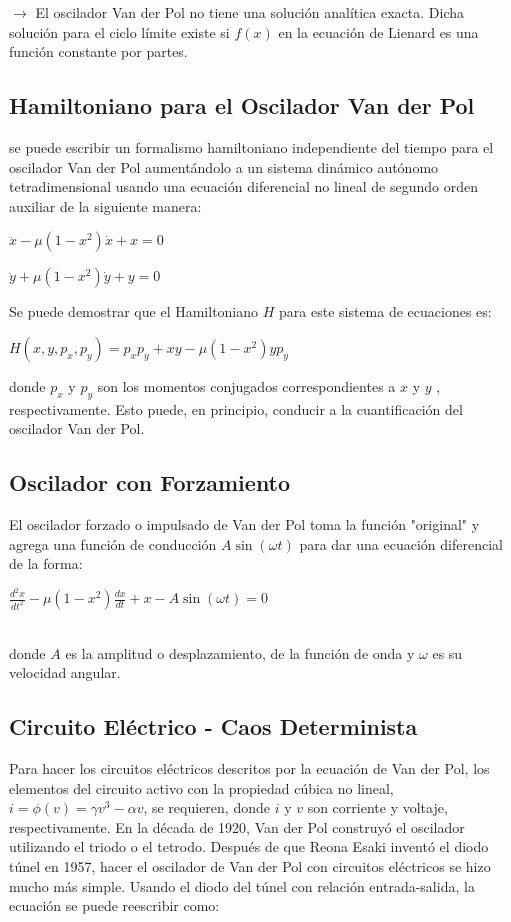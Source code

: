\documentclass[12pt]{article}
\begin{document}
$\to$ El oscilador Van der Pol no tiene una solución analítica exacta. Dicha solución para el ciclo límite existe si $f(x)$ en la ecuación de Lienard es una función constante por partes.




\subsection*{Hamiltoniano para el Oscilador Van der Pol}
se puede escribir un formalismo hamiltoniano independiente del tiempo para el oscilador Van der Pol aumentándolo a un sistema dinámico autónomo tetradimensional usando una ecuación diferencial no lineal de segundo orden auxiliar de la siguiente manera:\\
\centerline{$\displaystyle \ddot x - \mu (1-x^2)\dot x+x=0 $}
\centerline{$\displaystyle \ddot y + \mu (1-x^2)\dot y+y=0 $}
Se puede demostrar que el Hamiltoniano $H$ para este sistema de ecuaciones es:\\
\centerline{$ H(x,y,p_x,p_y) = p_x p_y +xy -\mu (1-x^2)yp_y$}
donde $p_x$ y $p_y$ son los momentos conjugados correspondientes a $x$ y $y$ , respectivamente. Esto puede, en principio, conducir a la cuantificación del oscilador Van der Pol.




\subsection*{Oscilador con Forzamiento}
El oscilador forzado o impulsado de Van der Pol toma la función "original" y agrega una función de conducción $A \sin ( \omega t )$ para dar una ecuación diferencial de la forma:\\

\centerline{$\displaystyle \frac{d^2x}{dt^2} - \mu (1-x^2) \frac{dx}{dt} +x-A \sin ( \omega t )  = 0$}
$ $\\
donde $A$ es la amplitud  o desplazamiento, de la función de onda y $\omega$ es su velocidad angular.




\subsection*{Circuito Eléctrico - Caos Determinista}
Para hacer los circuitos eléctricos descritos por la ecuación de Van der Pol, los elementos del circuito activo con la propiedad cúbica no lineal, $i = \phi(v)=\gamma v^3-\alpha v$, se requieren, donde $i$ y $v$ son corriente y voltaje, respectivamente. En la década de 1920, Van der Pol construyó el oscilador utilizando el triodo o el tetrodo. Después de que Reona Esaki inventó el diodo túnel en 1957, hacer el oscilador de Van der Pol con circuitos eléctricos se hizo mucho más simple.
Usando el diodo del túnel con relación entrada-salida, la ecuación se puede reescribir como:\\
\end{document}
